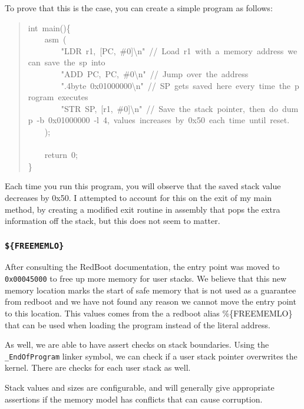 \documentclass[letterpaper]{article}
\begin{document}
To prove that this is the case, you can create a simple program as follows:
%
\begin{quote}{\ttfamily \raggedright \noindent
int~main()\{\\
~~~~asm~(\\
~~~~~~~~"LDR~r1,~{[}PC,~\#0{]}\textbackslash{}n"~//~Load~r1~with~a~memory~address~we~can~save~the~sp~into\\
~~~~~~~~"ADD~PC,~PC,~\#0\textbackslash{}n"~//~Jump~over~the~address\\
~~~~~~~~".4byte~0x01000000\textbackslash{}n"~//~SP~gets~saved~here~every~time~the~program~executes\\
~~~~~~~~"STR~SP,~{[}r1,~\#0{]}\textbackslash{}n"~//~Save~the~stack~pointer,~then~do~dump~-b~0x01000000~-l~4,~values~increases~by~0x50~each~time~until~reset.\\
~~~~);\\
~\\
~~~~return~0;\\
\}
}
\end{quote}

Each time you run this program, you will observe that the saved stack value decreases by 0x50.  I attempted to account for this on the exit of my main method, by creating a modified exit routine in assembly that pops the extra information off the stack, but this does not seem to matter.


\subsubsection{\texttt{\$\{FREEMEMLO\}}%
  \label{freememlo}%
}

After consulting the RedBoot documentation, the entry point was moved to \texttt{0x00045000} to free up more memory for user stacks. We believe that this new memory location marks the start of safe memory that is not used as a guarantee from redboot and we have not found any reason we cannot move the entry point to this location.  This values comes from the a redboot alias \%\{FREEMEMLO\} that can be used when loading the program instead of the literal address.

As well, we are able to have assert checks on stack boundaries. Using the \texttt{\_EndOfProgram} linker symbol, we can check if a user stack pointer overwrites the kernel. There are checks for each user stack as well.

Stack values and sizes are configurable, and will generally give appropriate assertions if the memory model has conflicts that can cause corruption.
\end{document}
